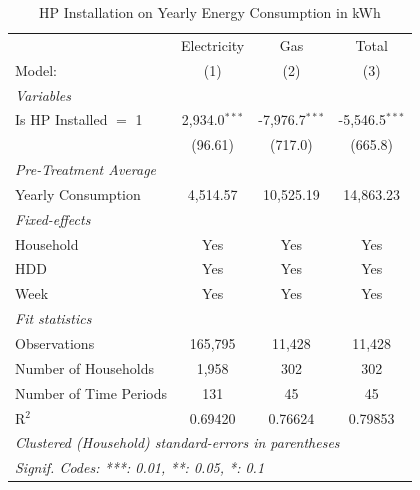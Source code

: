 
\begin{table}[htbp]
   \caption{HP Installation on Yearly Energy Consumption in kWh}
   \centering
   \begin{tabular}{lccc}
      \tabularnewline \midrule \midrule
                                     & Electricity     & Gas              & Total \\   
      Model:                         & (1)             & (2)              & (3)\\  
      \midrule
      \emph{Variables}\\
      Is HP Installed $=$ 1          & 2,934.0$^{***}$ & -7,976.7$^{***}$ & -5,546.5$^{***}$\\   
                                     & (96.61)         & (717.0)          & (665.8)\\   
      \midrule
\emph{Pre-Treatment Average}\\
      Yearly Consumption             & 4,514.57        & 10,525.19        & 14,863.23\\  
\midrule
      \emph{Fixed-effects}\\
      Household                      & Yes             & Yes              & Yes\\  
      HDD                            & Yes             & Yes              & Yes\\  
      Week                           & Yes             & Yes              & Yes\\  
      \midrule
      \emph{Fit statistics}\\
      Observations                   & 165,795         & 11,428           & 11,428\\  
      Number of Households & 1,958           & 302              & 302\\  
      Number of Time Periods         & 131             & 45               & 45\\  
      R$^2$                          & 0.69420         & 0.76624          & 0.79853\\  
      \midrule \midrule
      \multicolumn{4}{l}{\emph{Clustered (Household) standard-errors in parentheses}}\\
      \multicolumn{4}{l}{\emph{Signif. Codes: ***: 0.01, **: 0.05, *: 0.1}}\\
   \end{tabular}
\end{table}


